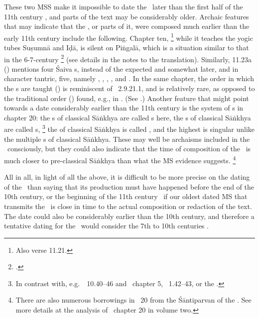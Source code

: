 These two MSS make it impossible to date the \VSS\ later 
than the first half of the 11th century \CE, and parts of the text
may be considerably older.
Archaic features that may indicate 
that the \VSS, or parts of it, were
composed much earlier than the early 11th century
include the following. Chapter ten,%
		\footnote{Also verse 11.21.} 
while it teaches the yogic tubes
 Suṣumnā and Iḍā, is silent on Piṅgalā, 
which is a situation similar to that in 
the 6-7-century \Nisvnaya%
	\footnote{.}  
(see details in the notes to the translation).
Similarly, 11.23a () mentions four
Śaiva s, instead of the expected and 
somewhat later, and in character tantric, five, namely
, , , 
, and . In the same chapter,
the order in which the s are taught
() 
is reminiscent of \Apastambadharmasutra\ 2.9.21.1,
and is relatively rare,
as opposed to the traditional order () found, e.g., in
\MANU. (See .)
Another feature that might point towards a date
considerably earlier than the 11th century is the 
system of s in chapter 20:
the s of classical Sāṅkhya are called 
s here, the s of
classical Sāṅkhya are called s,%
		\footnote{In contrast with, e.g.\ \SDHU\ 10.40--46 and
					\UUMS\ chapter 5, \DHARMP\ 1.42--43, or the \SIVAUP.}
the  of classical Sāṅkhya
is called , and the highest  
is singular unlike the multiple s of classical 
Sāṅkhya. These may well be archaisms 
included in the \VSS\ consciously, but they could also
indicate that the time of composition of the \VSS\
is much closer to pre-classical Sāṅkhya than what the MS
evidence suggests.%
	\footnote{There are also numerous borrowings in \VSS\ 20
					from the Śāntiparvan of the \MBH. See more details
					at the analysis of \VSS\ chapter 20 in volume two.}

All in all, in light of all the above,
it is difficult to be more precise on the dating
of the \VSS\ than saying that its production must have
happened before the end of the 10th century, or the beginning
of the 11th century \CE\ if our oldest dated MS that transmits
the \VSS\ is close in time to the actual composition or
redaction of the text. The date could also be considerably
earlier than the 10th century, and therefore a tentative dating
for the \VSS\ would consider the 7th to 10th centuries \CE.

